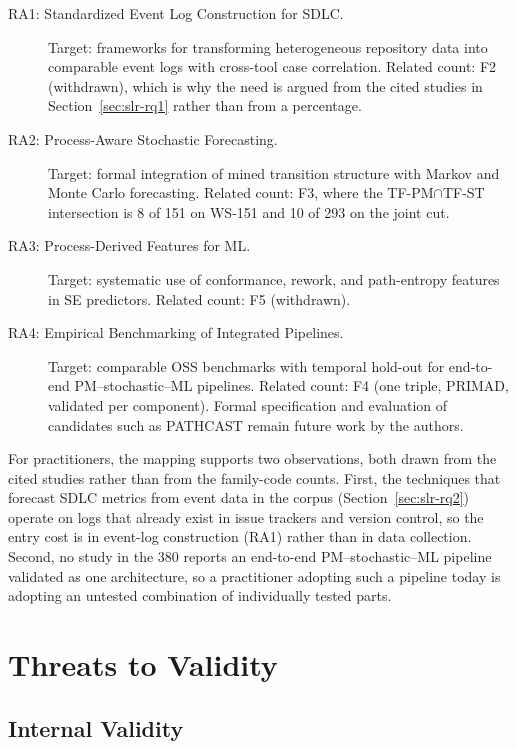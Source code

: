 \begin{description}
\item[RA1: Standardized Event Log Construction for SDLC.]
  Target: frameworks for transforming heterogeneous repository data into
  comparable event logs with cross-tool case correlation. Related count:
  F2 (withdrawn), which is why the need is argued from the cited studies
  in Section~\ref{sec:slr-rq1} rather than from a percentage.

\item[RA2: Process-Aware Stochastic Forecasting.]
  Target: formal integration of mined transition structure with Markov
  and Monte Carlo forecasting. Related count: F3, where the
  TF-PM$\cap$TF-ST intersection is 8 of 151 on WS-151 and 10 of 293 on
  the joint cut.

\item[RA3: Process-Derived Features for ML.]
  Target: systematic use of conformance, rework, and path-entropy features
  in SE predictors. Related count: F5 (withdrawn).

\item[RA4: Empirical Benchmarking of Integrated Pipelines.]
  Target: comparable OSS benchmarks with temporal hold-out for end-to-end
  PM--stochastic--ML pipelines. Related count: F4 (one triple, PRIMAD,
  validated per component). Formal specification and evaluation of
  candidates such as PATHCAST remain future work by the authors.
\end{description}

\label{sec:slr-practitioners}%
For practitioners, the mapping supports two observations, both drawn from
the cited studies rather than from the family-code counts. First, the
techniques that forecast SDLC metrics from event data in the corpus
(Section~\ref{sec:slr-rq2}) operate on logs that already exist in issue
trackers and version control, so the entry cost is in event-log
construction (RA1) rather than in data collection. Second, no study in the
380 reports an end-to-end PM--stochastic--ML pipeline validated as one
architecture, so a practitioner adopting such a pipeline today is adopting
an untested combination of individually tested parts.


\section{Threats to Validity}
\label{sec:slr-threats}

\subsection{Internal Validity}

